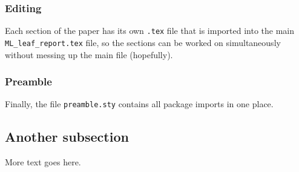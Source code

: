 \subsubsection{Editing}
Each section of the paper has its own \verb+.tex+ file that is imported into the main \verb+ML_leaf_report.tex+ file, so the sections can be worked on simultaneously without messing up the main file (hopefully).

\subsubsection{Preamble}
Finally, the file \verb+preamble.sty+ contains all package imports in one place.

\subsection{Another subsection}
More text goes here.
